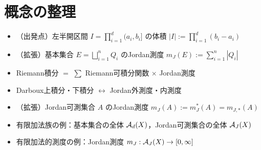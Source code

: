 
\section{概念の整理}
\begin{itemize}
    \item （出発点）左半開区間 $I = \prod_{i=1}^d (a_i,b_i]$ の体積 $|I| := \prod_{i=1}^d (b_i - a_i)$
    \item （拡張）基本集合 $E=\bigsqcup_{i=1}^n Q_i$ のJordan測度 $m_J(E) := \sum_{i=1}^n |Q_i|$
    \item Riemann積分 $=$ $\sum$ Riemann可積分関数 $\times$ Jordan測度
    \item Darboux上積分・下積分 $\leftrightarrow$ Jordan外測度・内測度
    \item （拡張）Jordan可測集合 $A$ のJordan測度 $m_J(A) := m_J^*(A) = m_{J,*}(A)$
    \item 有限加法族の例：基本集合の全体 $\mathcal A_d(X)$，Jordan可測集合の全体 $\mathcal A_J(X)$
    \item 有限加法的測度の例：Jordan測度 $m_J : \mathcal A_J(X) \to [0,\infty]$
\end{itemize}
